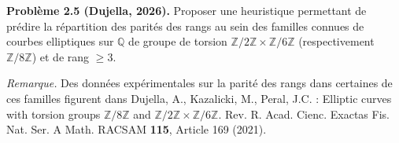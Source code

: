 \textbf{Problème 2.5 (Dujella, 2026).} Proposer une heuristique permettant de prédire la répartition des parités des rangs au sein des familles connues de courbes elliptiques sur $\mathbb{Q}$ de groupe de torsion $\mathbb{Z}/2\mathbb{Z}\times\mathbb{Z}/6\mathbb{Z}$ (respectivement $\mathbb{Z}/8\mathbb{Z}$) et de rang $\geqslant 3$.

\medskip

\textit{Remarque.} Des données expérimentales sur la parité des rangs dans certaines de ces familles figurent dans Dujella, A., Kazalicki, M., Peral, J.C. : Elliptic curves with torsion groups $\mathbb{Z}/8\mathbb{Z}$ and $\mathbb{Z}/2\mathbb{Z}\times\mathbb{Z}/6\mathbb{Z}$. Rev. R. Acad. Cienc. Exactas Fis. Nat. Ser. A Math. RACSAM \textbf{115}, Article 169 (2021).

